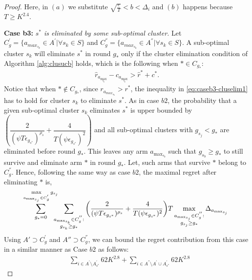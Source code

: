 \begin{proof}
Here, in $(a)$ we substitute $\sqrt{\frac{e}{T}} < b < \Delta_i$ and $(b)$ happens because $T\geq K^{2.4}$. 


\textbf{Case b3:} \textit{$s^{*}$ is eliminated by some sub-optimal cluster.} 
Let $C_{g}^{'}=\lbrace a_{max_{s_{k}}}\in A^{'}|\forall s_{k}\in S \rbrace$ and $C_{g}^{''}=\lbrace a_{max_{s_{k}}}\in A^{''}|\forall s_{k}\in S \rbrace$. A sub-optimal cluster $s_k$ will eliminate $s^*$ in round $g_*$ only if the cluster elimination condition of Algorithm \ref{alg:clusucb} holds, which is the following when ${*}\in C_{g_{*}}$:
\begin{align}
\hat r_{a_{\max_{s_k}}} - c_{a_{\max_{s_k}}} > \hat{r}^{*}+ c^{*}.
\label{eq:caseb3-cluselim1}
\end{align}
Notice that when ${*}\notin C_{g_{*}}$, since $r_{a_{max_{s_{k}}}}>r^{*}$, the inequality in \eqref{eq:caseb3-cluselim1} has to hold for cluster $s_k$ to eliminate $s^*$.
As in case $b2$, the probability that a given sub-optimal cluster $s_k$ eliminates $s^*$ is upper bounded by  $\left(\dfrac{2}{(\psi T\epsilon_{g_{s^{*}}})^{\rho_{s}}} +  \dfrac{4}{T(\psi\epsilon_{g_{s^*}})^2}\right)$ and all sub-optimal clusters with $g_{s_{j}}< g_{*}$ are eliminated before round $g_*$. This leaves any arm $a_{\max_{s_{b}}}$ such that $g_{s_{b}}\geq g_{*}$ to still survive and eliminate arm ${*}$ in round $g_{*}$. Let, such arms that survive ${*}$ belong to $C_{g}^{''}$. Hence, following the same way as case $b2$,  the maximal regret after eliminating ${*}$ is,
 \begin{align*}
 \!\!\sum_{g_{*}=0}^{\max\limits_{a_{\max_{s_{j}}}\in C_{g}^{'}}g_{s_{j}}}\!\!\!\!\!\sum_{\substack{\scriptsize a_{\max_{s_{k}}}\in C_{g}^{''}: \\ g_{s_{k}} \geq g_{*}}}\bigg(\dfrac{2}{(\psi T\epsilon_{g_{s^{*}}})^{\rho_{s}}} + \dfrac{4}{T(\psi\epsilon_{g_{s^*}})^2}\bigg)T\max_{\substack{a_{\max_{s_{j}}}\in C_{g}^{''}: \\ g_{s_{j}}\geq g_{*}}}{\Delta}_{a_{\max_{s_{j}}}}
 \end{align*}
Using $A'\supset C_{g}^{'}$ and $A''\supset C_{g}^{''}$, we can bound the regret contribution from this case in a similar manner as Case $b2$ as follows:
\begin{align*}
 & \sum_{i\in A^{'}\setminus A_{s^*}^{'}} 62K^{2.8} +\sum_{i\in A^{''}\setminus A^{'}\cup A_{s^*}^{'}} 62K^{2.8}
\end{align*}


\end{proof}
